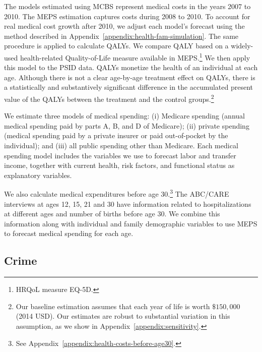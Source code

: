 The models estimated using MCBS represent medical costs in the years 2007 to 2010. The MEPS estimation captures costs during 2008 to 2010. To account for real medical cost growth after 2010, we adjust each model's forecast using the method described in  Appendix~\ref{appendix:health-fam-simulation}. The same procedure is applied to calculate QALYs. We compare QALY based on a widely-used health-related Quality-of-Life measure available in MEPS.\footnote{HRQoL measure EQ-5D.} We then apply this model to the PSID data. QALYs monetize the health of an individual at each age. Although there is not a clear age-by-age treatment effect on QALYs, there is a statistically and substantively significant difference in the accumulated present value of the QALYs between the treatment and the control groups.\footnote{Our baseline estimation assumes that each year of life is worth  $\$150,000$ (2014 USD). Our estimates are robust to substantial variation in this assumption, as we show in  Appendix~\ref{appendix:sensitivity}.}

We estimate three models of medical spending: (i) Medicare spending (annual medical spending paid by parts A, B, and D of Medicare); (ii) private spending (medical spending paid by a private insurer or paid out-of-pocket by the individual); and (iii) all public spending other than Medicare. Each medical spending model includes the variables we use to forecast labor and transfer income, together with current health, risk factors, and functional status as explanatory variables.

We also calculate medical expenditures before age 30.\footnote{See Appendix~\ref{appendix:health-costs-before-age30}.} The ABC/CARE interviews at ages 12, 15, 21 and 30 have information related to hospitalizations at different ages and number of births before age 30. We combine this information along with individual and family demographic variables to use MEPS to forecast medical spending for each age.

\subsection{Crime}

